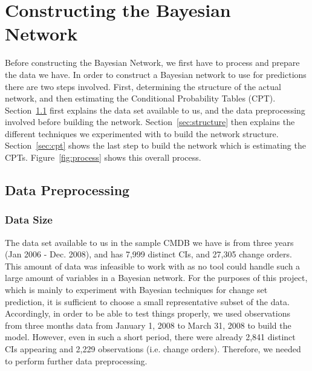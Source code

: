 \documentclass[10pt,twocolumn,letterpaper]{article}
\begin{document}
\section{Constructing the Bayesian Network}
\label{sec:constructing}

Before constructing the Bayesian Network, we first have to process and prepare the data we have. In order to construct a Bayesian network to use for
predictions there are two steps involved. First, determining the structure of the actual network, and then estimating the Conditional Probability Tables
(CPT). Section~\ref{sec:data} first explains the data set available to us, and the data preprocessing involved before building the network.
Section~\ref{sec:structure} then explains the different techniques we experimented with to build the network structure. Section~\ref{sec:cpt} shows the last
step to build the network which is estimating the CPTs. Figure~\ref{fig:process} shows this overall process.

\subsection{Data Preprocessing}
\label{sec:data}

\subsubsection*{Data Size}
The data set available to us in the sample CMDB we have is from three years (Jan 2006 - Dec. 2008), and has 7,999 distinct CIs, and 27,305 change orders.
This amount of data
was infeasible to work with as no tool could handle such a large amount of variables in a Bayesian network. For the purposes of this project, which is mainly to
experiment with Bayesian techniques for change set prediction, it is sufficient to choose a small representative subset of the data. Accordingly, in order to be
able to test things properly, we used observations from three months data from January 1, 2008 to March 31, 2008 to build the model. However, even in such a
short period, there were already 2,841 distinct CIs appearing and 2,229 observations (i.e. change orders). Therefore, we needed to perform further data
preprocessing. 
\end{document}
